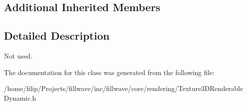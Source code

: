 \subsection*{Additional Inherited Members}


\subsection{Detailed Description}
Not used. 

The documentation for this class was generated from the following file\+:\begin{DoxyCompactItemize}
\item 
/home/filip/\+Projects/fillwave/inc/fillwave/core/rendering/Texture3\+D\+Renderable\+Dynamic.\+h\end{DoxyCompactItemize}
